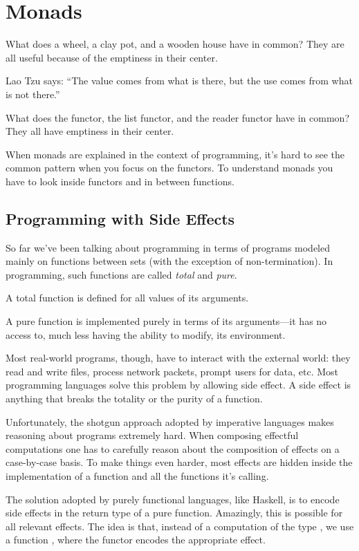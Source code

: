 \documentclass[DaoFP]{subfiles}
\begin{document}
\setcounter{chapter}{12}

\chapter{Monads}

What does a wheel, a clay pot, and a wooden house have in common? They are all useful because of the emptiness in their center. 

Lao Tzu says: ``The value comes from what is there, but the use comes from what is not there.''

What does the  functor, the list functor, and the reader functor have in common? They all have emptiness in their center. 

When monads are explained in the context of programming, it's hard to see the common pattern when you focus on the functors. To understand monads you have to look inside functors and in between functions.

\section{Programming with Side Effects}

So far we've been talking about programming in terms of programs modeled mainly on functions between sets (with the exception of non-termination). In programming, such functions are called \emph{total} and \emph{pure}. 

A total function is defined for all values of its arguments. 

A pure function is implemented purely in terms of its arguments---it has no access to, much less having the ability to modify, its environment. 

Most real-world programs, though, have to interact with the external world: they read and write files, process network packets, prompt users for data, etc. Most programming languages solve this problem by allowing side effect. A side effect is anything that breaks the totality or the purity of a function. 

Unfortunately, the shotgun approach adopted by imperative languages makes reasoning about programs extremely hard. When composing effectful computations one has to carefully reason about the composition of effects on a case-by-case basis. To make things even harder, most effects are hidden inside the implementation of a function and all the functions it's calling.

The solution adopted by purely functional languages, like Haskell, is to encode side effects in the return type of a pure function. Amazingly, this is possible for all relevant effects. The idea is that, instead of a computation of the type , we use a function , where the functor  encodes the appropriate effect. 
\end{document}
